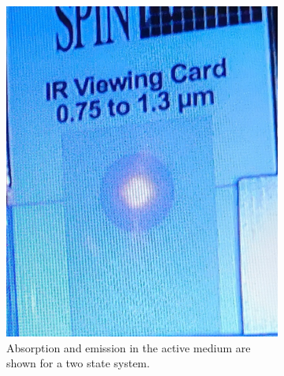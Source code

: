 \begin{figure}
    \centering
    \begin{subfigure}{0.49\textwidth}
        \includegraphics[width=\textwidth]{bilder/laser_before.jpg}
        \caption{Absorption and emission in the active medium are shown for a two state system. \cite{anleitungHeNe}}
        \label{fig:laser_before}
    \end{subfigure}
    \hfill
    \begin{subfigure}{0.49\textwidth}

\end{subfigure}
\end{figure}
